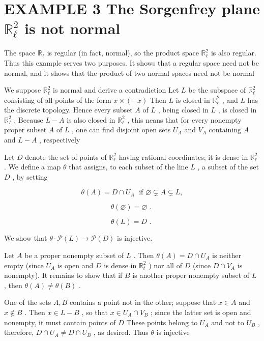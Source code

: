 \section*{EXAMPLE 3 The Sorgenfrey plane \({\mathbb{R}}_{\ell }^{2}\) is not normal}

The space \({\mathbb{R}}_{\ell }\) is regular (in fact, normal), so the product space \({\mathbb{R}}_{\ell }^{2}\) is also regular. Thus this example serves two purposes. It shows that a regular space need not be normal, and it shows that the product of two normal spaces need not be normal

We suppose \({\mathbb{R}}_{\ell }^{2}\) is normal and derive a contradiction Let \(L\) be the subspace of \({\mathbb{R}}_{\ell }^{2}\) consisting of all points of the form \(x \times  \left( {-x}\right)\) Then \(L\) is closed in \({\mathbb{R}}_{\ell }^{2}\) , and \(L\) has the discrete topology. Hence every subset \(A\) of \(L\) , being closed in \(L\) , is closed in \({\mathbb{R}}_{I}^{2}\) . Because \(L - A\) is also closed in \({\mathbb{R}}_{\ell }^{2}\) , this neans that for every nonempty proper subset \(A\) of \(L\) , one can find disjoint open sets \({U}_{A}\) and \({V}_{A}\) containing \(A\) and \(L - A\) , respectively

Let \(D\) denote the set of points of \({\mathbb{R}}_{\ell }^{2}\) having rational coordinates; it is dense in \({\mathbb{R}}_{\ell }^{2}\) . We define a map \(\theta\) that assigns, to each subset of the line \(L\) , a subset of the set \(D\) , by setting

\[
\theta \left( A\right)  = D \cap  {U}_{A}\;\text{ if }\varnothing  \subsetneq  A \subsetneq  L,
\]

\[
\theta \left( \varnothing \right)  = \varnothing \text{ . }
\]

\[
\theta \left( L\right)  = D\text{ . }
\]

We show that \(\theta  \cdot  \mathcal{P}\left( L\right)  \rightarrow  \mathcal{P}\left( D\right)\) is injective.

Let \(A\) be a proper nonempty subset of \(L\) . Then \(\theta \left( A\right)  = D \cap  {U}_{A}\) is neither empty (since \({U}_{A}\) is open and \(D\) is dense in \({\mathbb{R}}_{t}^{2}\) ) nor all of \(D\) (since \(D \cap  {V}_{A}\) is nonempty). It remains to show that if \(B\) is another proper nonempty subset of \(L\) , then \(\theta \left( A\right)  \neq  \theta \left( B\right)\) .

One of the sets \(A,B\) contains a point not in the other; suppose that \(x \in  A\) and \(x \notin  B\) . Then \(x \in  L - B\) , so that \(x \in  {U}_{A} \cap  {V}_{B}\) ; since the latter set is open and nonempty, it must contain points of \(D\) These points belong to \({U}_{A}\) and not to \({U}_{B}\) , therefore, \(D \cap  {U}_{A} \neq  D \cap  {U}_{B}\) , as desired. Thus \(\theta\) is injective

